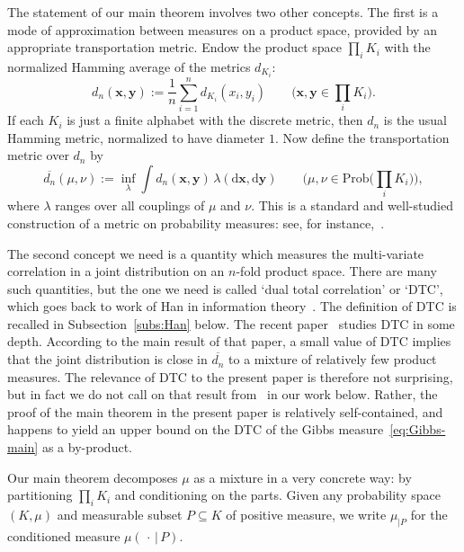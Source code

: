 \documentclass[aop,preprint]{imsart}
\theoremstyle{remark}
\renewcommand{\bf}[1]{\boldsymbol{#1}}
\renewcommand{\rm}[1]{\mathrm{#1}}
\renewcommand{\d}{\mathrm{d}}
\renewcommand{\l}{\lambda}
\newcommand{\ol}[1]{\overline{#1}}
\renewcommand{\Pr}{\rm{Prob}}
\newcommand{\DTC}{\mathrm{DTC}}
\begin{document}
The statement of our main theorem involves two other concepts.  The first is a mode of approximation between measures on a product space, provided by an appropriate transportation metric.  Endow the product space $\prod_i K_i$ with the normalized Hamming average of the metrics $d_{K_i}$:
\[d_n(\bf{x},\bf{y}) := \frac{1}{n}\sum_{i=1}^n d_{K_i}(x_i,y_i) \qquad \Big(\bf{x},\bf{y} \in \prod_i K_i\Big).\]
If each $K_i$ is just a finite alphabet with the discrete metric, then $d_n$ is the usual Hamming metric, normalized to have diameter $1$.  Now define the transportation metric over $d_n$ by
\begin{equation}\label{eq:trans}
\ol{d_n}(\mu,\nu) := \inf_\l \int d_n(\bf{x},\bf{y})\,\l(\d\bf{x},\d\bf{y}) \qquad \Big(\mu,\nu \in \Pr\Big(\prod_i K_i\Big)\Big),
\end{equation}
where $\l$ ranges over all couplings of $\mu$ and $\nu$. This is a standard and well-studied construction of a metric on probability measures: see, for instance,~\cite[Section 11.8]{Dud--book}.

The second concept we need is a quantity which measures the multi-variate correlation in a joint distribution on an $n$-fold product space.  There are many such quantities, but the one we need is called `dual total correlation' or `DTC', which goes back to work of Han in information theory~\cite{Han75}.  The definition of DTC is recalled in Subsection~\ref{subs:Han} below.  The recent paper~\cite{Aus--TC+DTC} studies DTC in some depth.  According to the main result of that paper, a small value of $\DTC$ implies that the joint distribution is close in $\ol{d_n}$ to a mixture of relatively few product measures.  The relevance of DTC to the present paper is therefore not surprising, but in fact we do not call on that result from~\cite{Aus--TC+DTC} in our work below.  Rather, the proof of the main theorem in the present paper is relatively self-contained, and happens to yield an upper bound on the DTC of the Gibbs measure~\eqref{eq:Gibbs-main} as a by-product.

Our main theorem decomposes $\mu$ as a mixture in a very concrete way: by partitioning $\prod_i K_i$ and conditioning on the parts.  Given any probability space $(K,\mu)$ and measurable subset $P\subseteq K$ of positive measure, we write $\mu_{|P}$ for the conditioned measure $\mu(\,\cdot\,|\,P)$.
\end{document}
